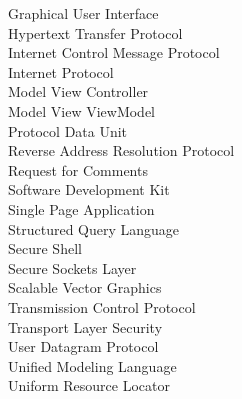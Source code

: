 \documentclass[12pt,a4paper,oneside]{book}
\begin{document}
\begin{spacing}{1.241}
\begin{minipage}{0.5\textwidth}
\begin{flushleft}
Graphical User Interface\\
Hypertext Transfer Protocol\\
Internet Control Message Protocol\\
Internet Protocol\\
Model View Controller\\
Model View ViewModel\\
Protocol Data Unit\\
Reverse Address Resolution Protocol\\
Request for Comments\\
Software Development Kit\\
Single Page Application\\
Structured Query Language\\
Secure Shell\\
Secure Sockets Layer\\
Scalable Vector Graphics\\
Transmission Control Protocol\\
Transport Layer Security\\
User Datagram Protocol\\
Unified Modeling Language\\
Uniform Resource Locator\\
\end{flushleft}
\end{minipage}\\[4cm]
\end{spacing}
\vfill
\end{document}
